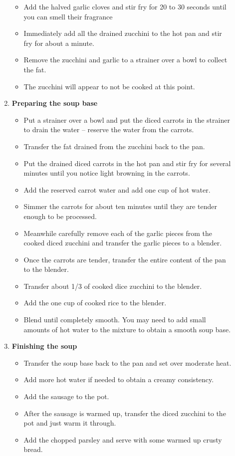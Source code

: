 \documentclass[11pt,letterpaper]{article}
\newcommand \fileName {ZucchiniChorizoSoup}
\begin{document}
\begin{description}
\begin{enumerate}
\begin{itemize}
	\item Add the halved garlic cloves and stir fry for 20 to 30 seconds until you can smell their fragrance
	\item Immediately add all the drained zucchini to the hot pan and stir fry for about a minute.
	\item Remove the zucchini and garlic to a strainer over a bowl to collect the fat.
	\item The zucchini will appear to not be cooked at this point. 	
	\end{itemize}
	\item{\bf Preparing the soup base}
	\begin{itemize}
	\item Put a strainer over a bowl and put the diced carrots in the strainer to drain the water -- reserve the water from the carrots.
	\item Transfer the fat drained from the zucchini back to the pan.
	\item Put the drained diced carrots in the hot pan and stir fry for several minutes until you notice light browning in the carrots.
	\item Add the reserved carrot water and add one cup of hot water.
	\item Simmer the carrots for about ten minutes until they are tender enough to be processed.
	\item Meanwhile carefully remove each of the garlic pieces from the cooked diced zucchini and transfer the garlic pieces to a blender.
	\item Once the carrots are tender, transfer the entire content of the pan to the blender.
	\item Transfer about 1/3 of cooked dice zucchini to the blender.
	\item Add the one cup of cooked rice to the blender.
	\item Blend until completely smooth. You may need to add small amounts of hot water to the mixture to obtain a smooth soup base.
	\end{itemize}
	\item{\bf Finishing the soup}
	\begin{itemize}
	\item Transfer the soup base back to the pan and set over moderate heat.
	\item Add more hot water if needed to obtain a creamy consistency.
	\item Add the sausage to the pot.
	\item After the sausage is warmed up, transfer the diced zucchini to the pot and just warm it through.
	\item Add the chopped parsley and serve with some warmed up crusty bread.
	\end{itemize}
	\end{enumerate}
\end{description}

\end{document}
